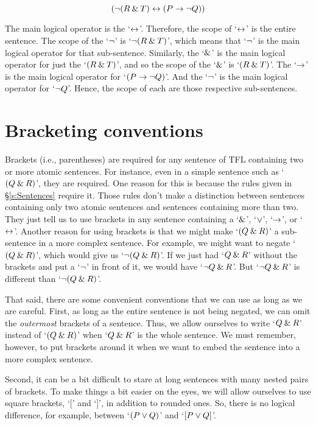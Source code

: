 $$({\neg}(R \mathbin{\&} T) \leftrightarrow (P \rightarrow {\neg} Q))$$

The main logical operator is the `$\leftrightarrow$'. Therefore, the scope of `$\leftrightarrow$' is the entire sentence. 
The scope of the `${\neg}$' is `${\neg}(R \mathbin{\&} T)$', which means that `${\neg}$' is the main logical operator for that sub-sentence. 
Similarly, the `$\mathbin{\&}$' is the main logical operator for just the `$(R \mathbin{\&} T)$', and so the scope of the `$\mathbin{\&}$' is `$(R \mathbin{\&} T)$'. 
The `$\rightarrow$' is the main logical operator for `$(P \rightarrow {\neg} Q)$'. And the `${\neg}$' is the main logical operator for `${\neg} Q$'. Hence, the scope of each are those respective sub-sentences. 




\section{Bracketing conventions}
\label{TFLconventions}
Brackets (i.e., parentheses) are required for any sentence of TFL containing two or more atomic sentences. For instance, even in a simple sentence such as `$(Q \mathbin{\&} R)$', they are required. One reason for this is because the rules given in \S\ref{s:Sentences} require it. Those rules don't make a distinction between sentences containing only two atomic sentences and sentences containing more than two. They just tell us to use brackets in any sentence containing a `$\mathbin{\&}$', `$\vee$', `$\rightarrow$', or `$\leftrightarrow$'. Another reason for using brackets is that we might make `$(Q \mathbin{\&} R)$' a sub-sentence in a more complex sentence. For example, we might want to negate `$(Q \mathbin{\&} R)$', which would give us `${\neg}(Q \mathbin{\&} R)$'. If we just had `$Q \mathbin{\&} R$' without the brackets and put a `${\neg}$' in front of it, we would have `${\neg} Q \mathbin{\&} R$'. But `${\neg} Q \mathbin{\&} R$' is different than `${\neg}(Q\mathbin{\&} R)$'. 

That said, there are some convenient conventions that we can use as long as we are careful. First, as long as the entire sentence is not being negated,  we can omit the \emph{outermost} brackets of a sentence. Thus, we allow ourselves to write `$Q \mathbin{\&} R$' instead of `$(Q \mathbin{\&} R)$' when `$Q \mathbin{\&} R$' is the whole sentence. We must remember, however, to put brackets around it when we want to embed the sentence into a more complex sentence.

Second, it can be a bit difficult to stare at long sentences with many nested pairs of brackets. To make things a bit easier on the eyes, we will allow ourselves to use square brackets, `[' and `]', in addition to rounded ones. So, there is no logical difference, for example, between `$(P\vee Q)$' and `$[P\vee Q]$'. 

